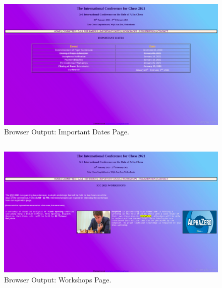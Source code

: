 \documentclass[12pt, a4]{article}
\begin{document}
\subsection*{}
\begin{figure}[h]
\centering
\caption{Browser Output: Important Dates Page.}
\includegraphics[scale= 0.25]{Output/Dates.png}
\end{figure}

\newpage
\subsection*{}
\begin{figure}[h]
\centering
\caption{Browser Output: Workshops Page.}
\includegraphics[scale= 0.25]{Output/Workshops.png}
\end{figure}

\newpage
\end{document}
